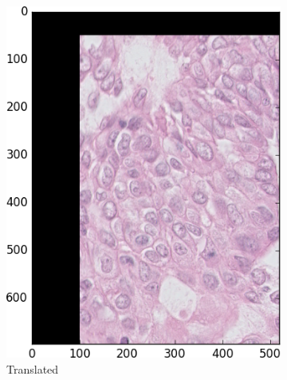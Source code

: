 \documentclass[a4paper,10pt]{article}
\begin{document}
\begin{figure}
\begin{multicols}{3}
\begin{subfigure}{0.33\textwidth}
    \includegraphics[width=\linewidth]{shift.png}\par 
    \caption{Translated}
    \label{fig:shift}
	\end{subfigure}%
	\begin{subfigure}{0.33\textwidth}

\end{subfigure}
\end{multicols}
\end{figure}
\end{document}
